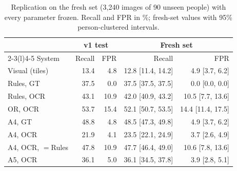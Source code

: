 \begin{table}[!t]
\caption{Replication on the fresh set (3{,}240 images of 90 unseen people) with every parameter frozen. Recall and FPR in \%; fresh-set values with 95\% person-clustered intervals.}
\label{tab:fresh}
\centering
\scriptsize
\setlength{\tabcolsep}{3pt}
\renewcommand{\arraystretch}{1.06}
\begin{tabular}{@{}l r r r r@{}}
\toprule
 & \multicolumn{2}{c}{v1 test} & \multicolumn{2}{c}{Fresh set} \\ \cmidrule(lr){2-3}\cmidrule(l){4-5}
System & Recall & FPR & Recall & FPR \\
\midrule
Visual (tiles) & 13.4 & 4.8 & 12.8 {\tiny[11.4, 14.2]} & 4.9 {\tiny[3.7, 6.2]} \\
Rules, GT & 37.5 & 0.0 & 37.5 {\tiny[37.5, 37.5]} & 0.0 {\tiny[0.0, 0.0]} \\
Rules, OCR & 43.1 & 10.9 & 42.0 {\tiny[40.9, 43.2]} & 10.5 {\tiny[7.7, 13.6]} \\
OR, OCR & 53.7 & 15.4 & 52.1 {\tiny[50.7, 53.5]} & 14.4 {\tiny[11.4, 17.5]} \\
A4, GT & 48.8 & 4.8 & 48.5 {\tiny[47.3, 49.8]} & 4.9 {\tiny[3.7, 6.2]} \\
A4, OCR & 21.9 & 4.1 & 23.5 {\tiny[22.1, 24.9]} & 3.7 {\tiny[2.6, 4.9]} \\
A4, OCR, $=$Rules & 47.8 & 10.9 & 47.7 {\tiny[46.4, 49.0]} & 10.6 {\tiny[7.8, 13.6]} \\
A5, OCR & 36.1 & 5.0 & 36.1 {\tiny[34.5, 37.8]} & 3.9 {\tiny[2.8, 5.1]} \\
\bottomrule
\end{tabular}
\end{table}
